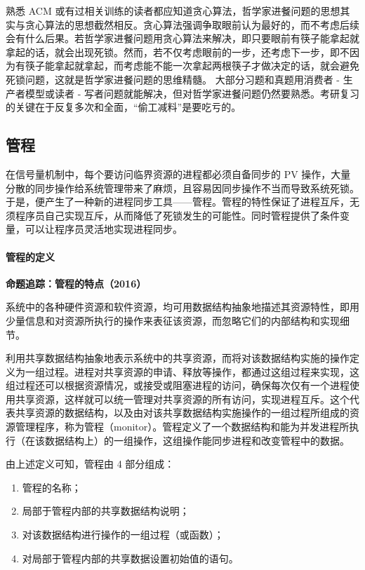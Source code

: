 \documentclass{ctexbook}
\begin{document}
熟悉 ACM 或有过相关训练的读者都应知道贪心算法，哲学家进餐问题的思想其实与贪心算法的思想截然相反。贪心算法强调争取眼前认为最好的，而不考虑后续会有什么后果。若哲学家进餐问题用贪心算法来解决，即只要眼前有筷子能拿起就拿起的话，就会出现死锁。然而，若不仅考虑眼前的一步，还考虑下一步，即不因为有筷子能拿起就拿起，而考虑能不能一次拿起两根筷子才做决定的话，就会避免死锁问题，这就是哲学家进餐问题的思维精髓。
大部分习题和真题用消费者 - 生产者模型或读者 - 写者问题就能解决，但对哲学家进餐问题仍然要熟悉。考研复习的关键在于反复多次和全面，“偷工减料”是要吃亏的。

\subsection{管程}
在信号量机制中，每个要访问临界资源的进程都必须自备同步的 PV 操作，大量分散的同步操作给系统管理带来了麻烦，且容易因同步操作不当而导致系统死锁。于是，便产生了一种新的进程同步工具——管程。管程的特性保证了进程互斥，无须程序员自己实现互斥，从而降低了死锁发生的可能性。同时管程提供了条件变量，可以让程序员灵活地实现进程同步。

\paragraph{管程的定义}
\textbf{命题追踪：管程的特点（2016）}

系统中的各种硬件资源和软件资源，均可用数据结构抽象地描述其资源特性，即用少量信息和对资源所执行的操作来表征该资源，而忽略它们的内部结构和实现细节。

利用共享数据结构抽象地表示系统中的共享资源，而将对该数据结构实施的操作定义为一组过程。进程对共享资源的申请、释放等操作，都通过这组过程来实现，这组过程还可以根据资源情况，或接受或阻塞进程的访问，确保每次仅有一个进程使用共享资源，这样就可以统一管理对共享资源的所有访问，实现进程互斥。这个代表共享资源的数据结构，以及由对该共享数据结构实施操作的一组过程所组成的资源管理程序，称为管程（monitor）。管程定义了一个数据结构和能为并发进程所执行（在该数据结构上）的一组操作，这组操作能同步进程和改变管程中的数据。

由上述定义可知，管程由 4 部分组成：
\begin{enumerate}
	\item 管程的名称；
	\item 局部于管程内部的共享数据结构说明；
	\item 对该数据结构进行操作的一组过程（或函数）；
	\item 对局部于管程内部的共享数据设置初始值的语句。
\end{enumerate}
\end{document}
